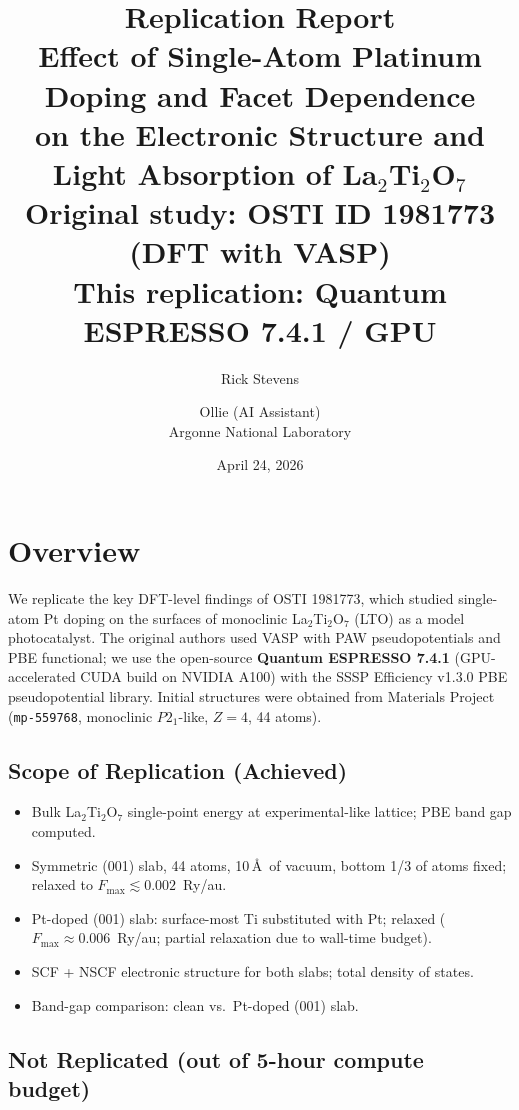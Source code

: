 \documentclass[11pt]{article}
\title{\textbf{Replication Report}\\[0.3em]
\large Effect of Single-Atom Platinum Doping and Facet Dependence\\
on the Electronic Structure and Light Absorption of La$_2$Ti$_2$O$_7$\\[0.3em]
\normalsize Original study: OSTI ID 1981773 (DFT with VASP)\\
This replication: Quantum ESPRESSO 7.4.1 / GPU}
\author{Rick Stevens \and Ollie (AI Assistant)\\
Argonne National Laboratory}
\date{April 24, 2026}
\begin{document}
\maketitle

\section{Overview}

We replicate the key DFT-level findings of OSTI 1981773, which studied
single-atom Pt doping on the surfaces of monoclinic
La$_2$Ti$_2$O$_7$ (LTO) as a model photocatalyst. The original authors
used VASP with PAW pseudopotentials and PBE functional; we use the
open-source \textbf{Quantum ESPRESSO 7.4.1} (GPU-accelerated CUDA build on
NVIDIA A100) with the SSSP Efficiency v1.3.0 PBE pseudopotential
library. Initial structures were obtained from Materials Project
(\texttt{mp-559768}, monoclinic $P2_1$-like, $Z=4$, 44 atoms).

\subsection{Scope of Replication (Achieved)}

\begin{itemize}[leftmargin=*]
    \item Bulk La$_2$Ti$_2$O$_7$ single-point energy at experimental-like lattice; PBE band gap computed.
    \item Symmetric (001) slab, 44 atoms, 10\,\AA\ of vacuum, bottom 1/3 of atoms fixed; relaxed to $F_{\max} \lesssim 0.002$~Ry/au.
    \item Pt-doped (001) slab: surface-most Ti substituted with Pt; relaxed ($F_{\max} \approx 0.006$~Ry/au; partial relaxation due to wall-time budget).
    \item SCF + NSCF electronic structure for both slabs; total density of states.
    \item Band-gap comparison: clean vs.\ Pt-doped (001) slab.
\end{itemize}

\subsection{Not Replicated (out of 5-hour compute budget)}
\end{document}
